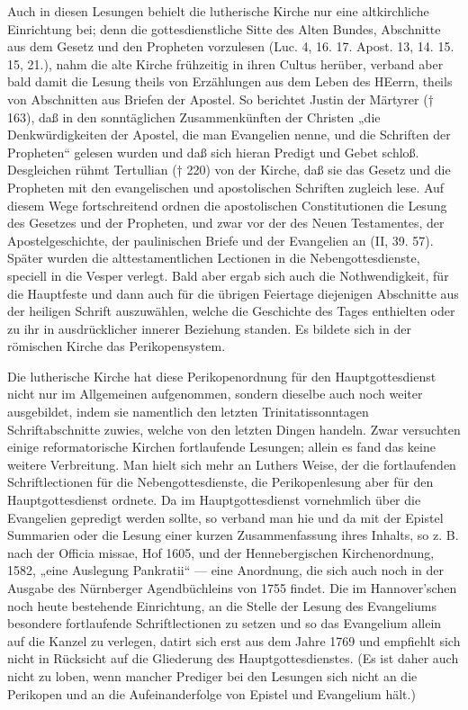 Auch in diesen Lesungen behielt die lutherische Kirche nur eine altkirchliche Einrichtung bei; denn die gottesdienstliche Sitte des Alten Bundes, Abschnitte aus dem Gesetz und den Propheten vorzulesen (Luc. 4, 16. 17. Apost. 13, 14. 15. 15, 21.), nahm die alte Kirche frühzeitig in ihren Cultus herüber, verband aber bald damit die Lesung theils von Erzählungen aus dem Leben des HEerrn, theils von Abschnitten aus Briefen der Apostel. So berichtet Justin der Märtyrer († 163), daß in den sonntäglichen Zusammenkünften der Christen „die Denkwürdigkeiten der Apostel, die man Evangelien nenne, und die Schriften der Propheten“ gelesen wurden und daß sich hieran Predigt und Gebet schloß. Desgleichen rühmt Tertullian († 220) von der Kirche, daß sie das Gesetz und die Propheten mit den evangelischen und apostolischen Schriften zugleich lese. Auf diesem Wege fortschreitend ordnen die apostolischen Constitutionen die Lesung des Gesetzes und der Propheten, und zwar vor der des Neuen Testamentes, der Apostelgeschichte, der paulinischen Briefe und der Evangelien an (II, 39. 57). Später wurden die alttestamentlichen Lectionen in die Nebengottesdienste, speciell in die Vesper verlegt. Bald aber ergab sich auch die Nothwendigkeit, für die Hauptfeste und dann auch für die übrigen Feiertage diejenigen Abschnitte aus der heiligen Schrift auszuwählen, welche die Geschichte des Tages enthielten oder zu ihr in ausdrücklicher innerer Beziehung standen. Es bildete sich in der römischen Kirche das Perikopensystem.

Die lutherische Kirche hat diese Perikopenordnung für den Hauptgottesdienst nicht nur im Allgemeinen aufgenommen, sondern dieselbe auch noch weiter ausgebildet, indem sie namentlich den letzten Trinitatissonntagen Schriftabschnitte zuwies, welche von den letzten Dingen handeln. Zwar versuchten einige reformatorische Kirchen fortlaufende Lesungen; allein es fand das keine weitere Verbreitung. Man hielt sich mehr an Luthers Weise, der die fortlaufenden Schriftlectionen für die Nebengottesdienste, die Perikopenlesung aber
für den Hauptgottesdienst ordnete. Da im Hauptgottesdienst vornehmlich über die Evangelien gepredigt werden sollte, so verband man hie und da mit der Epistel Summarien oder die Lesung einer kurzen Zusammenfassung ihres Inhalts, so z. B. nach der Officia missae, Hof 1605, und der Hennebergischen Kirchenordnung, 1582, „eine Auslegung Pankratii“ — eine Anordnung, die sich auch noch in der Ausgabe des Nürnberger Agendbüchleins von 1755 findet. Die im Hannover’schen noch heute bestehende Einrichtung, an die Stelle der Lesung des Evangeliums besondere fortlaufende Schriftlectionen zu setzen und so das Evangelium allein auf die Kanzel zu verlegen, datirt sich erst aus dem Jahre 1769 und empfiehlt sich nicht in Rücksicht auf die Gliederung des Hauptgottesdienstes. (Es ist daher auch nicht zu loben, wenn mancher Prediger bei den Lesungen sich nicht an die Perikopen und an die Aufeinanderfolge von Epistel und Evangelium hält.)

